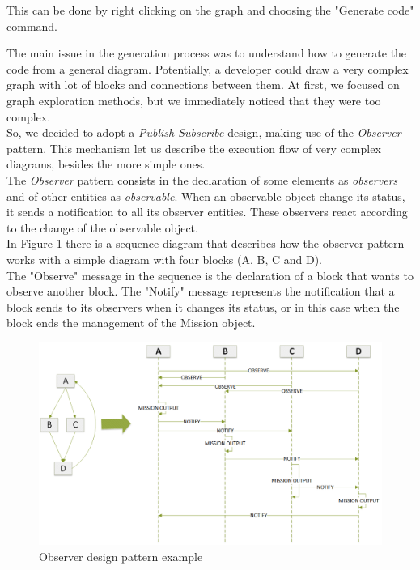 This can be done by right clicking on the graph and choosing the "Generate code" command.

The main issue in the generation process was to understand how to generate the code from a general diagram. 
Potentially, a developer could draw a very complex graph with lot of blocks and connections between them.
At first, we focused on graph exploration methods, but we immediately noticed that they were too complex.
\\

So, we decided to adopt a \textit{Publish-Subscribe} design, making use of the \textit{Observer} pattern. This mechanism let us describe the execution flow of very complex diagrams, besides the more simple ones.
\\
 
The \textit{Observer} pattern consists in the declaration of some elements as \textit{observers} and of other entities as \textit{observable}. 
When an observable object change its status, it sends a notification to all its observer entities. 
These observers react according to the change of the observable object.
\\

In Figure \ref{fig:observerPattern} there is a sequence diagram that describes how the observer pattern works with a simple diagram with four blocks (A, B, C and D).
\\
The "Observe" message in the sequence is the declaration of a block that wants to observe another block. The "Notify" message represents the notification that a block sends to its observers when it changes its status, or in this case when the block ends the management of the Mission object.
\\

 \begin{figure}
 \includegraphics[width=\linewidth]
 {pictures/pub_sub.png}
 \caption{Observer design pattern example}
 \label{fig:observerPattern}
 \end{figure}

